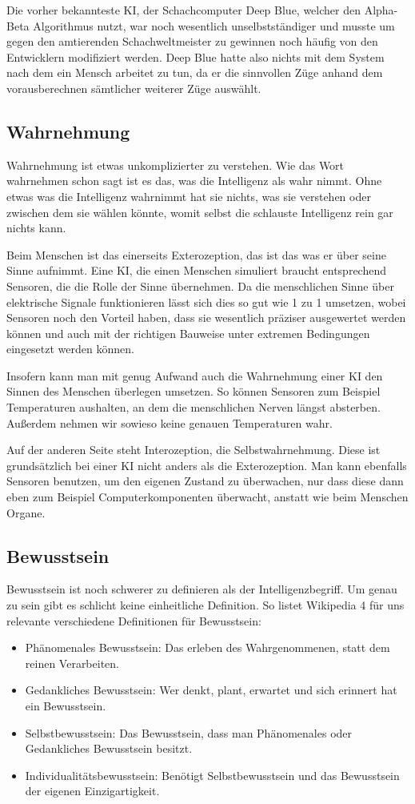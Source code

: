 Die vorher bekannteste KI, der Schachcomputer Deep Blue, welcher den Alpha-Beta Algorithmus nutzt, war noch wesentlich unselbstständiger und musste um gegen den amtierenden Schachweltmeister zu gewinnen noch häufig von den Entwicklern modifiziert werden.
Deep Blue hatte also nichts mit dem System nach dem ein Mensch arbeitet zu tun, da er die sinnvollen Züge anhand dem vorausberechnen sämtlicher weiterer Züge auswählt.

\subsection{Wahrnehmung}
Wahrnehmung ist etwas unkomplizierter zu verstehen.
Wie das Wort wahrnehmen schon sagt ist es das, was die Intelligenz als wahr nimmt.
Ohne etwas was die Intelligenz wahrnimmt hat sie nichts, was sie verstehen oder zwischen dem sie wählen könnte, womit selbst die schlauste Intelligenz rein gar nichts kann.

Beim Menschen ist das einerseits Exterozeption, das ist das was er über seine Sinne aufnimmt.
Eine KI, die einen Menschen simuliert braucht entsprechend Sensoren, die die Rolle der Sinne übernehmen.
Da die menschlichen Sinne über elektrische Signale funktionieren lässt sich dies so gut wie 1 zu 1 umsetzen, wobei Sensoren noch den Vorteil haben, dass sie wesentlich präziser ausgewertet werden können und auch mit der richtigen Bauweise unter extremen Bedingungen eingesetzt werden können.


Insofern kann man mit genug Aufwand auch die Wahrnehmung einer KI den Sinnen des Menschen überlegen umsetzen.
So können Sensoren zum Beispiel Temperaturen aushalten, an dem die menschlichen Nerven längst absterben.
Außerdem nehmen wir sowieso keine genauen Temperaturen wahr.


Auf der anderen Seite steht Interozeption, die Selbstwahrnehmung.
Diese ist grundsätzlich bei einer KI nicht anders als die Exterozeption.
Man kann ebenfalls Sensoren benutzen, um den eigenen Zustand zu überwachen, nur dass diese dann eben zum Beispiel Computerkomponenten überwacht, anstatt wie beim Menschen Organe.

\subsection{Bewusstsein}
Bewusstsein ist noch schwerer zu definieren als der Intelligenzbegriff.
Um genau zu sein gibt es schlicht keine einheitliche Definition.
So listet Wikipedia 4 für uns relevante verschiedene Definitionen für Bewusstsein:
\begin{itemize}
\item Phänomenales Bewusstsein: Das erleben des Wahrgenommenen, statt dem reinen Verarbeiten.
\item Gedankliches Bewusstsein: Wer denkt, plant, erwartet und sich erinnert hat ein Bewusstsein.
\item Selbstbewusstsein: Das Bewusstsein, dass man Phänomenales oder Gedankliches Bewusstsein besitzt.
\item Individualitätsbewusstsein: Benötigt Selbstbewusstsein und das Bewusstsein der eigenen Einzigartigkeit.
\end{itemize}

